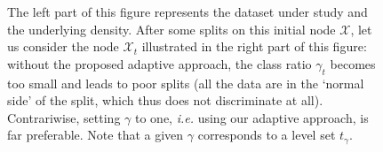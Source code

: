\begin{figure}
\caption{ The left part of this figure represents
the dataset under study and the underlying density.
After some splits on this initial node $\mathcal{X}$,
let us consider the node $\mathcal{X}_t$ illustrated in the right part of this figure:
without the proposed adaptive approach, the class ratio
$\gamma_t$ becomes too small
and leads to poor splits %
(all the data are in the `normal side' of the split, which thus does not discriminate at all).
Contrariwise, setting $\gamma$ to one, \textit{i.e.} using our adaptive approach,
is far preferable.
Note that a given $\gamma$ corresponds to a level set $t_{\gamma}$.}
\label{ocrf:fig:split_alpha}

\end{figure}



